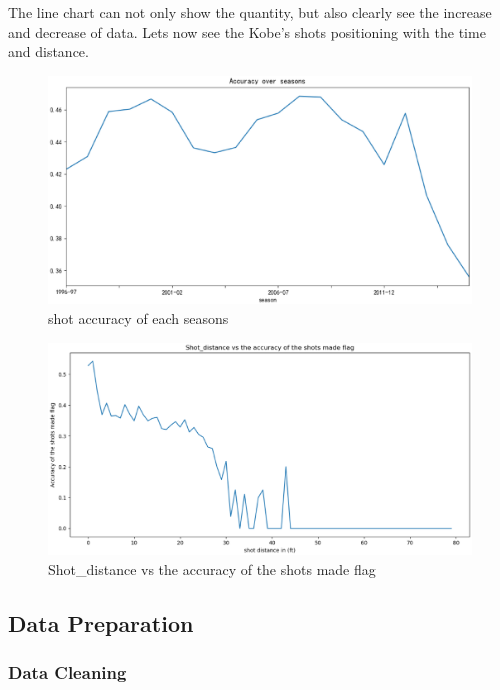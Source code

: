 The line chart can not only show the quantity, but also clearly see the increase and decrease of data.
Lets now see the Kobe's shots positioning with the time and distance.

\begin{figure}[htbp]
	\centering
	\includegraphics[scale=0.4]{m.eps
	}        %
	\caption{shot accuracy of each seasons}
	\label{fig12}
\end{figure}

\begin{figure}[htbp]
	\centering
	\includegraphics[scale=0.3]{s.eps
	}        %
	\caption{Shot_distance vs the accuracy of the shots made flag}
	\label{fig8}
\end{figure}

\subsection{Data Preparation}

\subsubsection{Data Cleaning}
\

